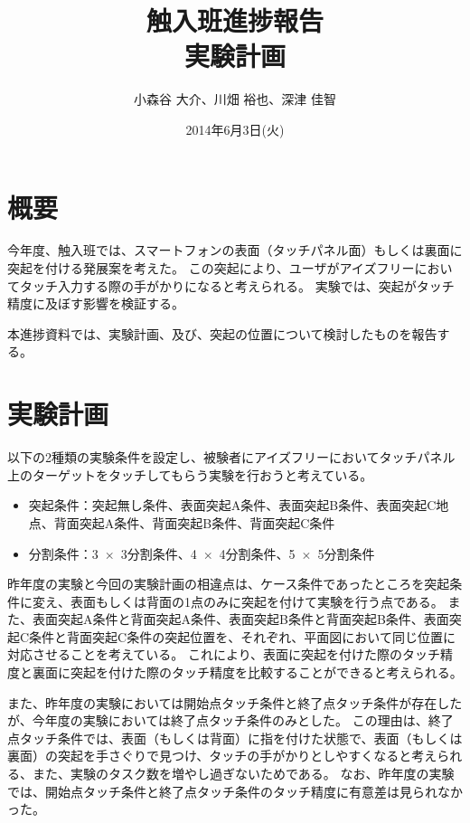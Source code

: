 \documentclass[11pt,a4paper]{jarticle}
\title{{触入班進捗報告\\実験計画}}
\date{2014年6月3日(火)}
\author{小森谷 大介、川畑 裕也、深津 佳智}
\begin{document}
\maketitle

\section{概要}
今年度、触入班では、スマートフォンの表面（タッチパネル面）もしくは裏面に突起を付ける発展案を考えた。
この突起により、ユーザがアイズフリーにおいてタッチ入力する際の手がかりになると考えられる。
実験では、突起がタッチ精度に及ぼす影響を検証する。

本進捗資料では、実験計画、及び、突起の位置について検討したものを報告する。

\section{実験計画}
以下の2種類の実験条件を設定し、被験者にアイズフリーにおいてタッチパネル上のターゲットをタッチしてもらう実験を行おうと考えている。
\begin{itemize}
  \item 突起条件：突起無し条件、表面突起A条件、表面突起B条件、表面突起C地点、背面突起A条件、背面突起B条件、背面突起C条件
  \item 分割条件：3~$\times$~3分割条件、4~$\times$~4分割条件、5~$\times$~5分割条件
\end{itemize}

昨年度の実験と今回の実験計画の相違点は、ケース条件であったところを突起条件に変え、表面もしくは背面の1点のみに突起を付けて実験を行う点である。
また、表面突起A条件と背面突起A条件、表面突起B条件と背面突起B条件、表面突起C条件と背面突起C条件の突起位置を、それぞれ、平面図において同じ位置に対応させることを考えている。
これにより、表面に突起を付けた際のタッチ精度と裏面に突起を付けた際のタッチ精度を比較することができると考えられる。

また、昨年度の実験においては開始点タッチ条件と終了点タッチ条件が存在したが、今年度の実験においては終了点タッチ条件のみとした。
この理由は、終了点タッチ条件では、表面（もしくは背面）に指を付けた状態で、表面（もしくは裏面）の突起を手さぐりで見つけ、タッチの手がかりとしやすくなると考えられる、また、実験のタスク数を増やし過ぎないためである。
なお、昨年度の実験では、開始点タッチ条件と終了点タッチ条件のタッチ精度に有意差は見られなかった。

\end{document}
